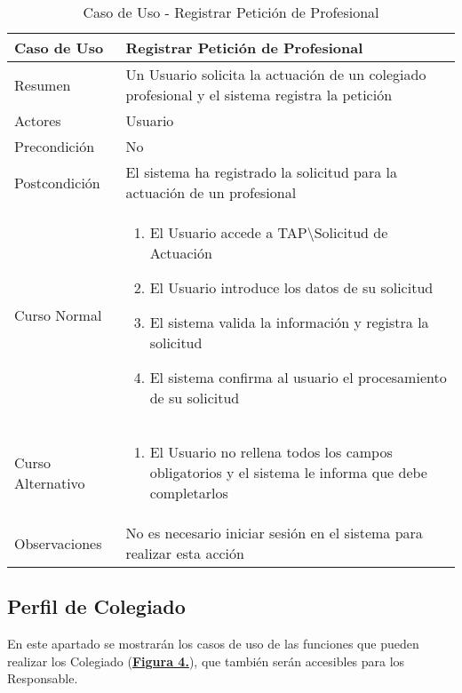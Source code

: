 \begin{table}[!htbp]
  \centering  \addtocounter{casouso}{1}
  \begin{tabular}{|l | p{100mm}|}
    \textbf{Caso de Uso}  & \textbf{Registrar Petición de Profesional} \\ \hline
    Resumen 		 & Un Usuario solicita la actuación de un colegiado profesional y el sistema registra la petición \\ \hline
    Actores  		 & Usuario \\ \hline
    Precondición  	 & No \\ \hline
    Postcondición  	 & El sistema ha registrado la solicitud para la actuación de un profesional \\ \hline
    Curso Normal   	 & \begin{enumerate}
	  \item El Usuario accede a TAP\textbackslash Solicitud de Actuación
	  \item El Usuario introduce los datos de su solicitud
	  \item El sistema valida la información y registra la solicitud
	  \item El sistema confirma al usuario el procesamiento de su solicitud
    \end{enumerate}  \\ \hline
    Curso Alternativo  & \begin{enumerate}
	  \item El Usuario no rellena todos los campos obligatorios y el sistema le informa que debe completarlos
    \end{enumerate}  \\ \hline
    Observaciones 	 & No es necesario iniciar sesión en el sistema para realizar esta acción  \\ \hline
  \end{tabular}
  \caption{Caso de Uso  - Registrar Petición de Profesional}
  \label{tab:cuuRegPeticProf}
\end{table}
\FloatBarrier


\subsection{Perfil de Colegiado}

\addtocounter{figura_cap4}{1}
En este apartado se mostrarán los casos de uso de las funciones que pueden realizar los Colegiado (\textbf{\hyperref[fig:CasosDeUso_Colegiado]{Figura 4.}}), que también serán accesibles para los Responsable.

